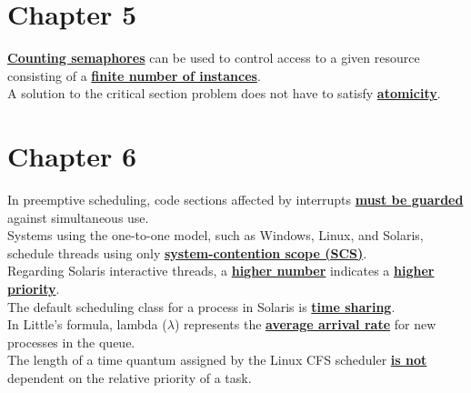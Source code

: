 \documentclass[10pt]{article}
\newcommand{\qw}[1]{\textbf{\ul{#1}}}
\begin{document}
\newpage
\section*{\centering Chapter 5}
\qw{Counting semaphores} can be used to control access to a given resource consisting of a \qw{finite number of instances}.\\[2mm] 
A solution to the critical section problem does not have to satisfy \qw{atomicity}.\\[2mm]

\newpage
\section*{\centering Chapter 6}
In preemptive scheduling, code sections affected by interrupts \qw{must be guarded} against simultaneous use.\\[2mm]
Systems using the one-to-one model, such as Windows, Linux, and Solaris, schedule threads using only \qw{system-contention scope (SCS)}.\\[2mm]
Regarding Solaris interactive threads, a \qw{higher number} indicates a \qw{higher priority}.\\[2mm]
The default scheduling class for a process in Solaris is \qw{time sharing}.\\[2mm]
In Little's formula, lambda ($\lambda$) represents the \qw{average arrival rate} for new processes in the queue.\\[2mm]
The length of a time quantum assigned by the Linux CFS scheduler \qw{is not} dependent on the relative priority of a task.\\[2mm]

\newpage
\end{document}
